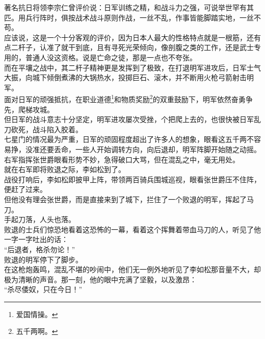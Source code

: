 \begin{multicols}{\theparacolNo}
著名抗日将领李宗仁曾评价说：日军训练之精，和战斗力之强，可说举世罕有其匹。用兵行阵时，俱按战术战斗原则作战，一丝不乱，作事皆能脚踏实地，一丝不苟。\\

应该说，这是一个十分客观的评价，因为日本人最大的性格特点就是一根筋，还有点二杆子，认准了就干到底，且有寻死光荣倾向，像剖腹之类的工作，还是武士专用的，普通人没这资格。说是亡命之徒，那是一点也不夸张。\\

而在平壤之战中，其二杆子精神更是发挥到了极致，在打退明军进攻后，日军士气大振，向城下倾倒煮沸的大锅热水，投掷巨石、滚木，并不断用火枪弓箭射击明军。\\

面对日军的顽强抵抗，在职业道德\footnote{爱国情操。}和物质奖励\footnote{五千两啊。}的双重鼓励下，明军依然奋勇争先，爬梯攻城。\\

但日军的战斗意志十分坚定，明军进攻屡次受挫，个把爬上去的，也很快被日军乱刀砍死，战斗陷入胶着。\\

七星门的情况最为严重，日军的顽固程度超出了许多人的想象，眼看这五千两不容易挣，没准还要丢命，一些人开始调转方向，向后退却，明军阵脚开始随之动摇。右军指挥张世爵眼看形势不妙，急得破口大骂，但在混乱之中，毫无用处。\\

就在右军即将败退之际，李如松到了。\\

战役打响后，李如松即披甲上阵，带领两百骑兵围城巡视，眼看张世爵压不住阵，便赶了过来。\\

但他没有理会张世爵，而是直接来到了城下，拦住了一个败退的明军，挥起了马刀。\\

手起刀落，人头也落。\\

败退的士兵们惊恐地看着这恐怖的一幕，看着这个挥舞着带血马刀的人，听见了他一字一字吐出的话：\\

“后退者，格杀勿论！”\\

败退的明军停下了脚步。\\

在这枪炮轰鸣，混乱不堪的吵闹中，他们无一例外地听见了李如松那音量不大，却极为清晰的声音。那一刻，他的眼中充满了坚毅，以及激昂：\\

“杀尽倭奴，只在今日！”\\


\end{multicols}
